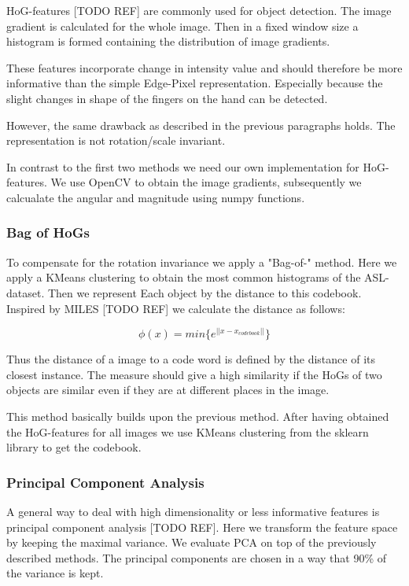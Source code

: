 \documentclass[letterpaper, 10 pt, conference]{ieeeconf}  %
\begin{document}
HoG-features [TODO REF] are commonly used for object detection. The image gradient is calculated for the whole image. Then in a fixed window size a histogram is formed containing the distribution of image gradients.

These features incorporate change in intensity value and should therefore be more informative than the simple Edge-Pixel representation. Especially because the slight changes in shape of the fingers on the hand can be detected.

However, the same drawback as described in the previous paragraphs holds. The representation is not rotation/scale invariant.

In contrast to the first two methods we need our own implementation for HoG-features. We use OpenCV to obtain the image gradients, subsequently we calcualate the angular and magnitude using numpy functions.

\subsubsection{Bag of HoGs}

To compensate for the rotation invariance we apply a "Bag-of-" method. Here we apply a KMeans clustering to obtain the most common histograms of the ASL-dataset. Then we represent Each object by the distance to this codebook. Inspired by MILES [TODO REF] we calculate the distance as follows:

\begin{equation}
	\phi(x) = min\{ e^{||x-x_{codebook}||}\}
\end{equation}

Thus the distance of a image to a code word is defined by the distance of its closest instance. The measure should give a high similarity if the HoGs of two objects are similar even if they are at different places in the image.

This method basically builds upon the previous method. After having obtained the HoG-features for all images we use KMeans clustering from the sklearn library to get the codebook.

\subsubsection{Principal Component Analysis}

A general way to deal with high dimensionality or less informative features is principal component analysis [TODO REF]. Here we transform the feature space by keeping the maximal variance. We evaluate PCA on top of the previously described methods. The principal components are chosen in a way that 90\% of the variance is kept.
\end{document}

